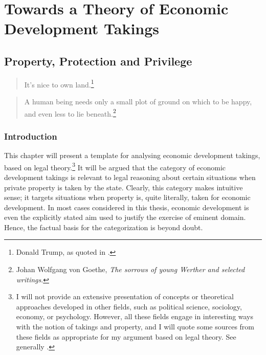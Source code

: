 \newcommand{\isr}[1]{{#1}}

\part{Towards a Theory of Economic Development Takings}

\chapter{Property, Protection and Privilege}\label{chap:1}

\begin{quote}
It's nice to own land.\footnote{Donald Trump, as quoted in \cite{booth12}.}
\end{quote}

\begin{quote}
A human being needs only a small plot of ground on which to be happy, and even less to lie beneath.\footnote{Johan Wolfgang von Goethe, {\it The sorrows of young Werther and selected writings}.}
\end{quote}

\section{Introduction}

This chapter will present a template for analysing economic development takings, based on legal theory.\footnote{I will not provide an extensive presentation of concepts or theoretical approaches developed in other fields, such as political science, sociology, economy, or psychology. However, all these fields engage in interesting ways with the notion of takings and property, and I will quote some sources from these fields as appropriate for my argument based on legal theory. See generally \cite{miceli11,nadler08,katz97,carruthers04}.} It will be argued that the category of economic development takings is relevant to legal reasoning about certain situations when private property is taken by the state. Clearly, this category makes intuitive sense; it targets situations when property is, quite literally, taken for economic development. In most cases considered in this thesis, economic development is even the explicitly stated aim used to justify the exercise of eminent domain. Hence, the factual basis for the categorization is beyond doubt.

